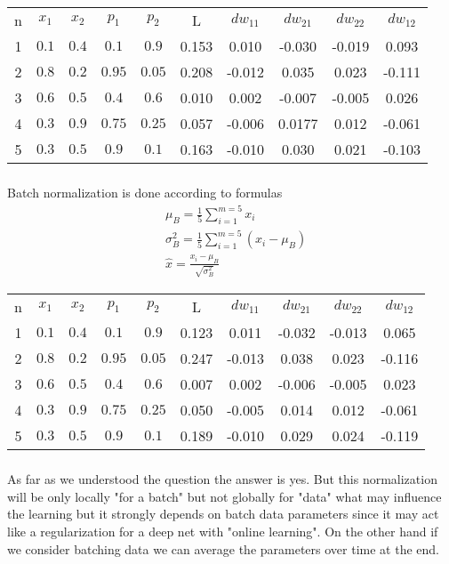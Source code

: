 \documentclass{article}
\begin{document}
\begin{center}
	\begin{tabular}{ |c|c|c|c|c|c|c|c|c|c| } 
		\hline
	n & $x_1$ & $x_2$ & $p_1$ & $p_2$ & L&  $dw_{11}$ & $dw_{21}$ & $dw_{22}$ & $dw_{12}$ \\
	1 & $0.1$ & $0.4$ & $0.1$ & $0.9$ & 0.153&  0.010 & -0.030 & -0.019 & 0.093 \\
	2 & $0.8 $ & $0.2$ & $0.95$ & $0.05$ & 0.208&  -0.012 & 0.035 & 0.023 & -0.111 \\
	3 & $0.6$ & $0.5$ & $0.4$ & $0.6$ & 0.010&  0.002 & -0.007 & -0.005 & 0.026 \\
	4 & $0.3$ & $0.9 $ & $0.75$ & $0.25$ & 0.057&  -0.006 & 0.0177 & 0.012 & -0.061 \\
	5 & $0.3$ & $0.5$ & $0.9$ & $0.1$ & 0.163&  -0.010 & 0.030 & 0.021 & -0.103 \\
		\hline
	\end{tabular}
\end{center}
\subsubsection{}
Batch normalization is done according to formulas
\begin{align*}
& \mu_B = \frac{1}{5} \sum_{i=1}^{m=5}x_i \\
& \sigma_B^2 = \frac{1}{5} \sum_{i=1}^{m=5}(x_i - \mu_B)  \\
& \hat{x} = \frac{x_i - \mu_B}{\sqrt{\sigma_B^2}}
\end{align*}
\begin{center}
	\begin{tabular}{ |c|c|c|c|c|c|c|c|c|c| } 
		\hline
		n & $x_1$ & $x_2$ & $p_1$ & $p_2$ & L&  $dw_{11}$ & $dw_{21}$ & $dw_{22}$ & $dw_{12}$ \\
		1 & $0.1$ & $0.4$ & $0.1$ & $0.9$ & 0.123&  0.011& -0.032 & -0.013 & 0.065 \\
		2 & $0.8 $ & $0.2$ & $0.95$ & $0.05$ & 0.247&  -0.013 & 0.038 & 0.023& -0.116 \\
		3 & $0.6$ & $0.5$ & $0.4$ & $0.6$ & 0.007&  0.002 & -0.006 & -0.005 & 0.023 \\
		4 & $0.3$ & $0.9 $ & $0.75$ & $0.25$ & 0.050&  -0.005 & 0.014 & 0.012 & -0.061 \\
		5 & $0.3$ & $0.5$ & $0.9$ & $0.1$ & 0.189 & -0.010 & 0.029 & 0.024 & -0.119 \\
		\hline
	\end{tabular}
\end{center}

\subsubsection{}
As far as we understood the question the answer is yes. But this normalization will be only locally "for a batch" but not globally for "data" what may influence the learning but it strongly depends on batch data parameters since it may act like a regularization for a deep net with "online learning". On the other hand if we consider batching data we can average the parameters over time at the end.
\end{document}

